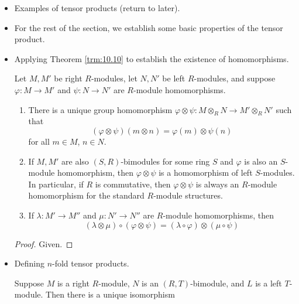 \documentclass[../notes.tex]{subfiles}
\begin{document}
\begin{itemize}
\begin{corollary}
        \begin{proof}
            Given.
        \end{proof}
    \end{corollary}
    \item Examples of tensor products (return to later).
    \item For the rest of the section, we establish some basic properties of the tensor product.
    \item Applying Theorem \ref{trm:10.10} to establish the existence of homomorphisms.
    \begin{theorem}\label{trm:10.13}
        Let $M,M'$ be right $R$-modules, let $N,N'$ be left $R$-modules, and suppose $\varphi:M\to M'$ and $\psi:N\to N'$ are $R$-module homomorphisms.
        \begin{enumerate}
            \item There is a unique group homomorphism $\varphi\otimes\psi:M\otimes_RN\to M'\otimes_RN'$ such that
            \begin{equation*}
                (\varphi\otimes\psi)(m\otimes n) = \varphi(m)\otimes\psi(n)
            \end{equation*}
            for all $m\in M$, $n\in N$.
            \item If $M,M'$ are also $(S,R)$-bimodules for some ring $S$ and $\varphi$ is also an $S$-module homomorphism, then $\varphi\otimes\psi$ is a homomorphism of left $S$-modules. In particular, if $R$ is commutative, then $\varphi\otimes\psi$ is always an $R$-module homomorphism for the standard $R$-module structures.
            \item If $\lambda:M'\to M''$ and $\mu:N'\to N''$ are $R$-module homomorphisms, then
            \begin{equation*}
                (\lambda\otimes\mu)\circ(\varphi\otimes\psi) = (\lambda\circ\varphi)\otimes(\mu\circ\psi)
            \end{equation*}
        \end{enumerate}
        \begin{proof}
            Given.
        \end{proof}
    \end{theorem}
    \item Defining $n$-fold tensor products.
    \begin{theorem}\label{trm:10.14}
        Suppose $M$ is a right $R$-module, $N$ is an $(R,T)$-bimodule, and $L$ is a left $T$-module. Then there is a unique isomorphism

\end{theorem}
\end{itemize}
\end{document}
